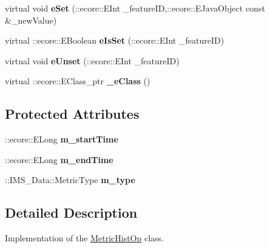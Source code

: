 \begin{DoxyCompactItemize}
\item 
\hypertarget{classIMS__Data_1_1MetricHistOp_ad9e21c41f837481bf2b5d309e95e416b}{
virtual void {\bfseries eSet} (::ecore::EInt \_\-featureID,::ecore::EJavaObject const \&\_\-newValue)}
\label{classIMS__Data_1_1MetricHistOp_ad9e21c41f837481bf2b5d309e95e416b}

\item 
\hypertarget{classIMS__Data_1_1MetricHistOp_a0b1334d678c3c48238159cb34161564c}{
virtual ::ecore::EBoolean {\bfseries eIsSet} (::ecore::EInt \_\-featureID)}
\label{classIMS__Data_1_1MetricHistOp_a0b1334d678c3c48238159cb34161564c}

\item 
\hypertarget{classIMS__Data_1_1MetricHistOp_a357c2c8aa007dddc09aab3363e43b78b}{
virtual void {\bfseries eUnset} (::ecore::EInt \_\-featureID)}
\label{classIMS__Data_1_1MetricHistOp_a357c2c8aa007dddc09aab3363e43b78b}

\item 
\hypertarget{classIMS__Data_1_1MetricHistOp_ab4539878526a3bc0bf3d763ad9c87814}{
virtual ::ecore::EClass\_\-ptr {\bfseries \_\-eClass} ()}
\label{classIMS__Data_1_1MetricHistOp_ab4539878526a3bc0bf3d763ad9c87814}

\end{DoxyCompactItemize}
\subsection*{Protected Attributes}
\begin{DoxyCompactItemize}
\item 
\hypertarget{classIMS__Data_1_1MetricHistOp_a7e0581d390d88c88046f6ea7b9a32823}{
::ecore::ELong {\bfseries m\_\-startTime}}
\label{classIMS__Data_1_1MetricHistOp_a7e0581d390d88c88046f6ea7b9a32823}

\item 
\hypertarget{classIMS__Data_1_1MetricHistOp_a73863751eda8bb3c321cf010255d288e}{
::ecore::ELong {\bfseries m\_\-endTime}}
\label{classIMS__Data_1_1MetricHistOp_a73863751eda8bb3c321cf010255d288e}

\item 
\hypertarget{classIMS__Data_1_1MetricHistOp_a98e04dc2ecf827a4710044571c3f8f30}{
::IMS\_\-Data::MetricType {\bfseries m\_\-type}}
\label{classIMS__Data_1_1MetricHistOp_a98e04dc2ecf827a4710044571c3f8f30}

\end{DoxyCompactItemize}


\subsection{Detailed Description}
Implementation of the \hyperlink{classIMS__Data_1_1MetricHistOp}{MetricHistOp} class. 

